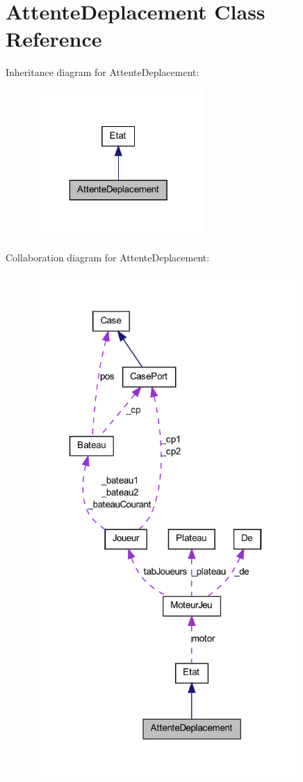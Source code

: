\hypertarget{class_attente_deplacement}{
\section{AttenteDeplacement Class Reference}
\label{class_attente_deplacement}
}


Inheritance diagram for AttenteDeplacement:
\nopagebreak
\begin{figure}[H]
\begin{center}
\leavevmode
\includegraphics[width=184pt]{class_attente_deplacement__inherit__graph}
\end{center}
\end{figure}


Collaboration diagram for AttenteDeplacement:
\nopagebreak
\begin{figure}[H]
\begin{center}
\leavevmode
\includegraphics[width=285pt]{class_attente_deplacement__coll__graph}
\end{center}
\end{figure}
